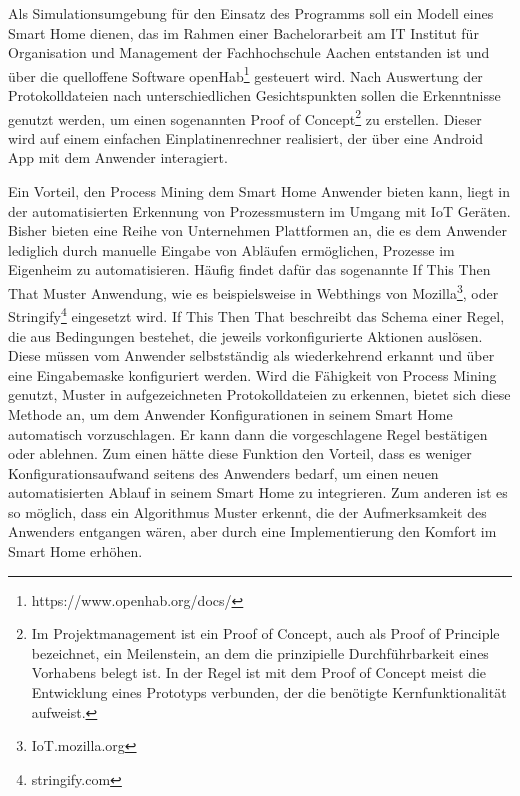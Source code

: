 Als Simulationsumgebung für den Einsatz des Programms soll ein Modell eines Smart Home dienen, das im Rahmen einer Bachelorarbeit am IT Institut für Organisation und Management der Fachhochschule Aachen entstanden ist und über die quelloffene Software openHab\footnote{https://www.openhab.org/docs/} gesteuert wird. Nach Auswertung der Protokolldateien nach unterschiedlichen Gesichtspunkten sollen die Erkenntnisse genutzt werden, um einen sogenannten Proof of Concept\footnote{Im Projektmanagement ist ein Proof of Concept, auch als Proof of Principle bezeichnet, ein Meilenstein, an dem die prinzipielle Durchführbarkeit eines Vorhabens belegt ist. In der Regel ist mit dem Proof of Concept meist die Entwicklung eines Prototyps verbunden, der die benötigte Kernfunktionalität aufweist.\cite{poc}} zu erstellen. Dieser wird auf einem einfachen Einplatinenrechner realisiert, der über eine Android App mit dem Anwender interagiert.

Ein Vorteil, den Process Mining dem Smart Home Anwender bieten kann, liegt in der automatisierten Erkennung von Prozessmustern im Umgang mit IoT Geräten. Bisher bieten eine Reihe von Unternehmen Plattformen an, die es dem Anwender lediglich durch manuelle Eingabe von Abläufen ermöglichen, Prozesse im Eigenheim zu automatisieren. Häufig findet dafür das sogenannte If This Then That Muster Anwendung, wie es beispielsweise in Webthings von Mozilla\footnote{IoT.mozilla.org},  oder Stringify\footnote{stringify.com} eingesetzt wird. 
\newpage
If This Then That beschreibt das Schema einer Regel, die aus Bedingungen bestehet, die jeweils vorkonfigurierte Aktionen auslösen. Diese müssen vom Anwender selbstständig als wiederkehrend erkannt und über eine Eingabemaske konfiguriert werden. Wird die Fähigkeit von Process Mining genutzt, Muster in aufgezeichneten Protokolldateien zu erkennen, bietet sich diese Methode an, um dem Anwender Konfigurationen in seinem Smart Home automatisch vorzuschlagen. Er kann dann die vorgeschlagene Regel bestätigen oder ablehnen. Zum einen hätte diese Funktion den Vorteil, dass es weniger Konfigurationsaufwand seitens des Anwenders bedarf, um einen neuen automatisierten Ablauf in seinem Smart Home zu integrieren. Zum anderen ist es so möglich, dass ein Algorithmus Muster erkennt, die der Aufmerksamkeit des Anwenders entgangen wären, aber durch eine Implementierung den Komfort im Smart Home erhöhen.


